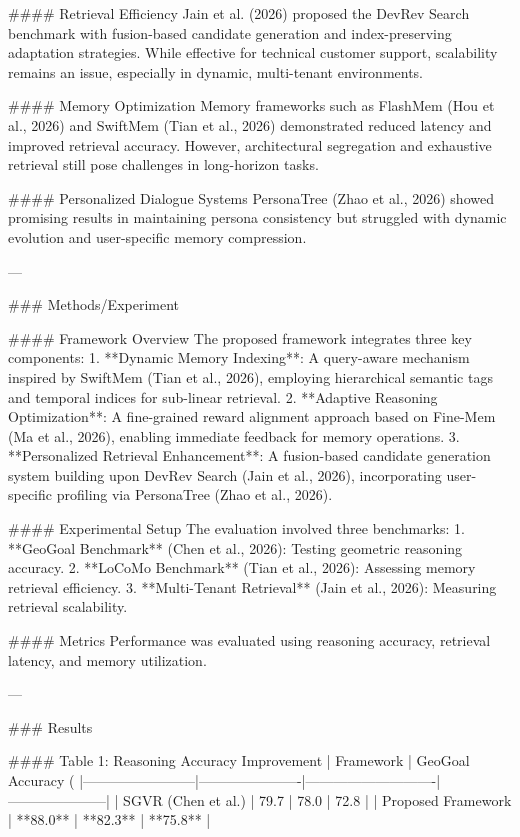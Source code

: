 #### Retrieval Efficiency  
Jain et al. (2026) proposed the DevRev Search benchmark with fusion-based candidate generation and index-preserving adaptation strategies. While effective for technical customer support, scalability remains an issue, especially in dynamic, multi-tenant environments.  

#### Memory Optimization  
Memory frameworks such as FlashMem (Hou et al., 2026) and SwiftMem (Tian et al., 2026) demonstrated reduced latency and improved retrieval accuracy. However, architectural segregation and exhaustive retrieval still pose challenges in long-horizon tasks.  

#### Personalized Dialogue Systems  
PersonaTree (Zhao et al., 2026) showed promising results in maintaining persona consistency but struggled with dynamic evolution and user-specific memory compression.  

---

### Methods/Experiment  

#### Framework Overview  
The proposed framework integrates three key components:  
1. **Dynamic Memory Indexing**: A query-aware mechanism inspired by SwiftMem (Tian et al., 2026), employing hierarchical semantic tags and temporal indices for sub-linear retrieval.  
2. **Adaptive Reasoning Optimization**: A fine-grained reward alignment approach based on Fine-Mem (Ma et al., 2026), enabling immediate feedback for memory operations.  
3. **Personalized Retrieval Enhancement**: A fusion-based candidate generation system building upon DevRev Search (Jain et al., 2026), incorporating user-specific profiling via PersonaTree (Zhao et al., 2026).  

#### Experimental Setup  
The evaluation involved three benchmarks:  
1. **GeoGoal Benchmark** (Chen et al., 2026): Testing geometric reasoning accuracy.  
2. **LoCoMo Benchmark** (Tian et al., 2026): Assessing memory retrieval efficiency.  
3. **Multi-Tenant Retrieval** (Jain et al., 2026): Measuring retrieval scalability.  

#### Metrics  
Performance was evaluated using reasoning accuracy, retrieval latency, and memory utilization.  

---

### Results  

#### Table 1: Reasoning Accuracy Improvement  
| Framework             | GeoGoal Accuracy (%
|------------------------|----------------------|----------------------------|---------------------|  
| SGVR (Chen et al.)     | 79.7                | 78.0                       | 72.8                |  
| Proposed Framework     | **88.0**            | **82.3**                   | **75.8**            |  

